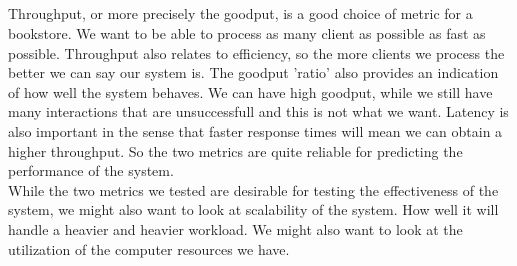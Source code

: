 \documentclass[a4paper]{article}
\begin{document}
\subsection{}
Throughput, or more precisely the goodput, is a good choice of metric for a bookstore. We want
to be able to process as many client as possible as fast as possible. Throughput also relates
to efficiency, so the more clients we process the better we can say our system is. The goodput
'ratio' also provides an indication of how well the system behaves. We can have high goodput,
while we still have many interactions that are unsuccessfull and this is not what we want.
Latency is also important in the sense that faster response times will mean we can obtain a higher throughput. So the two metrics are quite reliable for predicting the performance of the system. \\
While the two metrics we tested are desirable for testing the effectiveness of the system, we might also want to look at scalability of the system. How well it will handle a heavier and heavier workload. We might also want to look at the utilization of the computer resources we have.
\end{document}
